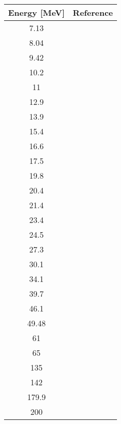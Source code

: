 \begin{tabular}{c  c} 
    \toprule
    \bf{Energy [MeV]} & \bf{Reference} \\
    \midrule
    7.13 & \cite{Kobayashi1960}\\
    8.04 & \cite{Kobayashi1960}\\
    9.42 & \cite{Kobayashi1960}\\
    10.2 & \cite{Kobayashi1960}\\
    11 & \cite{Hu1959}\\
    12.9 & \cite{Kobayashi1960}\\
    13.9 & \cite{Kobayashi1960}\\
    15.4 & \cite{Maxson1961}\\
    16.6 & \cite{Maxson1961}\\
    17.5 & \cite{Crawley1968}\\
    19.8 & \cite{Karban1969}\\
    20.4 & \cite{Karban1969}\\
    21.4 & \cite{Karban1969}\\
    23.4 & \cite{Cameron1968}\\
    24.5 & \cite{Cameron1968}\\
    27.3 & \cite{Cameron1968}\\
    30.1 & \cite{Cameron1968}\\
    34.1 & \cite{Cameron1968}\\
    39.7 & \cite{Cameron1968}\\
    46.1 & \cite{Cameron1968}\\
    49.48 & \cite{Fannon1967}\\
    61 & \cite{Bertrand1973}\\
    65 & \cite{Sakaguchi1982}\\
    135 & \cite{Kelly1989}\\
    142 & \cite{Taylor1961}\\
    179.9 & \cite{Kelly1990}\\
    200 & \cite{Glover1985}\\
    \bottomrule
\end{tabular}
